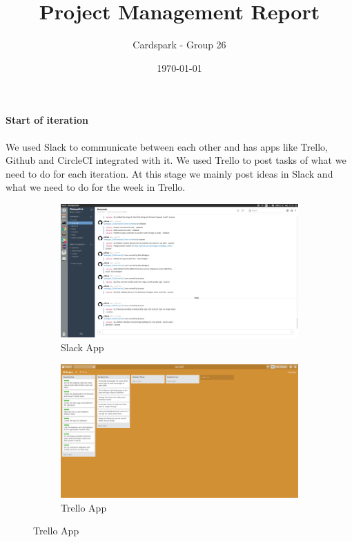 \documentclass[a4wide, 10pt]{article}
\begin{document}
\title{Project Management Report}

\author{Cardspark - Group 26}

\date{\today}         %

\maketitle            %

\paragraph{Start of iteration}
We used Slack to communicate between each other and has apps like Trello, Github and CircleCI integrated with it.  We used Trello to post tasks of what we need to do for each iteration.  At this stage we mainly post ideas in Slack and what we need to do for the week in Trello.
\begin{figure}[h]
\centering
\begin{subfigure}{.5\textwidth}
  \centering
  	\includegraphics[scale=0.1]{slackstart.png} 
  \caption{Slack App}
  \label{fig:sub1}
\end{subfigure}%
\begin{subfigure}{.5\textwidth}
  \centering
  	\includegraphics[scale=0.1]{iterationstart.png} 
  \caption{Trello App}
  \label{fig:sub2}
\end{subfigure}
\label{fig:test}
\end{figure}
\vspace*{-\baselineskip} 
\end{document}
